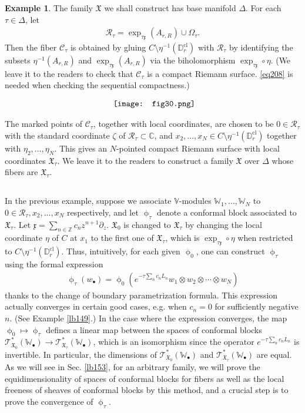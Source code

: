 \documentclass[11pt,b5paper,notitlepage]{article}
\theoremstyle{definition}
\newtheorem{eg}[df]{Example}
\theoremstyle{plain}
\newcommand{\fk}{\mathfrak}
\newcommand{\mc}{\mathcal}
\newcommand{\scr}{\mathscr}
\newcommand{\xk}{\mathfrak x}
\newcommand{\blt}{\bullet}
\newcommand{\Vbb}{\mathbb V}
\newcommand{\Wbb}{\mathbb W}
\newcommand{\Cbb}{\mathbb C}
\newcommand{\Zbb}{\mathbb Z}
\newcommand{\Dbb}{\mathbb D}
\newcommand{\cl}{\mathrm{cl}}
\numberwithin{equation}{section}
\begin{document}
\begin{eg}
The  family $\fk X$ we shall construct has base manifold $\Delta$. For each $\tau\in\Delta$, let
\begin{align*}
\mc R_\tau=\exp_{\tau\xk}(A_{r,R})\cup \Omega_\tau.
\end{align*}
Then the fiber $\mc C_\tau$ is obtained by gluing $C\setminus\eta^{-1}(\Dbb_r^\cl)$ with $\mc R_\tau$ by identifying the subsets $\eta^{-1}(A_{r,R})$ and $\exp_{\tau\xk}(A_{r,R})$ via the biholomorphism $\exp_{\tau\xk}\circ\eta$. (We leave it to the readers to check that $\mc C_\tau$ is a compact Riemann surface. \eqref{eq208} is needed when checking the sequential compactness.) 

\begin{align}
\vcenter{\hbox{{
\texttt{[image: fig30.png]}}}}
\end{align}

The marked points of $\mc C_\tau$, together with local coordinates, are chosen to be $0\in\mc R_\tau$ with the standard coordinate $\zeta$ of $\mc R_\tau\subset\Cbb$, and $x_2,\dots,x_N\in C\setminus\eta^{-1}(\Dbb_r^\cl)$ together with $\eta_2,\dots,\eta_N$. This gives an $N$-pointed compact Riemann surface with local coordinates $\fk X_\tau$. We leave it to the readers to construct a family $\fk X$ over $\Delta$ whose fibers are $\fk X_\tau$. \hfill\qedsymbol
\end{eg}


\subsection{}\label{lb110}
In the previous example, suppose we associate $\Vbb$-modules $\Wbb_1,\dots,\Wbb_N$ to $0\in\mc R_\tau,x_2,\dots,x_N$ respectively, and let $\upphi_\tau$ denote a conformal block associated to $\fk X_\tau$. Let $\xk=\sum_{n\in\Zbb} c_nz^{n+1}\partial_z$.  $\fk X_0$ is changed to $\fk X_\tau$ by changing the local coordinate $\eta$ of $C$ at $x_1$ to the first one of $\fk X_\tau$, which is $\exp_{\tau\xk}\circ\eta$ when restricted to $C\setminus\eta^{-1}(\Dbb_r^\cl)$. Thus, intuitively,  for each given $\upphi_0$, one can construct $\upphi_\tau$ using the formal expression
\begin{align}
\upphi_\tau(w_\blt)=\upphi_0(e^{-\tau\sum_n c_nL_n}w_1\otimes w_2\otimes\cdots\otimes w_N)\label{eq245}
\end{align}
thanks to the change of boundary parametrization formula. This expression actually converges in certain good cases, e.g. when $c_n=0$ for sufficiently negative $n$. (See Example \ref{lb149}.) In the case where the expression converges, the map $\upphi_0\mapsto\upphi_\tau$ defines a linear map between the spaces of conformal blocks $\scr T^*_{\fk X_0}(\Wbb_\blt)\rightarrow\scr T^*_{\fk X_\tau}(\Wbb_\blt)$, which is an isomorphism since the operator $e^{-\tau\sum_n c_nL_n}$ is invertible. In particular, the dimensions of $\scr T^*_{\fk X_0}(\Wbb_\blt)$ and $\scr T^*_{\fk X_\tau}(\Wbb_\blt)$ are equal. As we will see in Sec. \ref{lb153}, for an arbitrary family, we will prove the equidimensionality of spaces of conformal blocks for fibers as well as the local freeness of sheaves of conformal blocks by this method, and a crucial step is to prove the convergence of $\upphi_\tau$.
\end{document}
